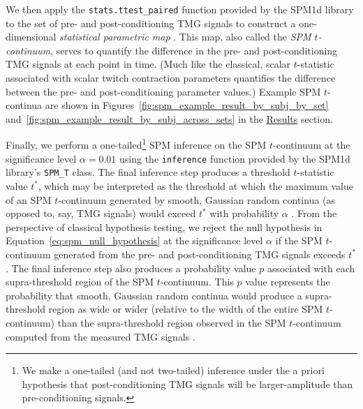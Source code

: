 \documentclass[utf8]{FrontiersinHarvard}
\begin{document}
We then apply the \texttt{stats.ttest\_paired} function provided by the SPM1d library to the set of pre- and post-conditioning TMG signals to construct a one-dimensional \textit{statistical parametric map} \citep{pataky-spm1d}.
This map, also called the \textit{SPM $ t $-continuum}, serves to quantify the difference in the pre- and post-conditioning TMG signals at each point in time.
(Much like the classical, scalar $ t $-statistic associated with scalar twitch contraction parameters quantifies the difference between the pre- and post-conditioning parameter values.)
Example SPM $ t $-continua are shown in Figures~\ref{fig:spm_example_result_by_subj_by_set} and~\ref{fig:spm_example_result_by_subj_across_sets} in the \hyperref[s:results]{Results} section.

Finally, we perform a one-tailed\footnote{We make a one-tailed (and not two-tailed) inference under the a priori hypothesis that post-conditioning TMG signals will be larger-amplitude than pre-conditioning signals.} SPM inference on the SPM $ t $-continuum at the significance level $ \alpha = 0.01 $ using the \texttt{inference} function provided by the SPM1d library's \texttt{SPM\_T} class.
The final inference step produces a threshold $ t $-statistic value $ t^{*} $, which may be interpreted as the threshold at which the maximum value of an SPM $ t $-continuum generated by smooth, Gaussian random continua (as opposed to, say, TMG signals) would exceed $ t^{*} $ with probability $ \alpha $ \citep{pataky-spm1d}.
From the perspective of classical hypothesis testing, we reject the null hypothesis in Equation~\ref{eq:spm_null_hypothesis} at the significance level $ \alpha $ if the SPM $ t $-continuum generated from the pre- and post-conditioning TMG signals exceeds $ t^{*} $.
The final inference step also produces a probability value $ p $ associated with each supra-threshold region of the SPM $ t $-continuum.
This $ p $ value represents the probability that smooth, Gaussian random continua would produce a supra-threshold region as wide or wider (relative to the width of the entire SPM $ t $-continuum) than the supra-threshold region observed in the SPM $ t $-continuum computed from the measured TMG signals \citep{pataky-spm1d}.
\end{document}
